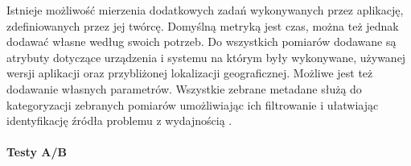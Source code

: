 Istnieje możliwość mierzenia dodatkowych zadań wykonywanych przez aplikację, zdefiniowanych przez jej twórcę. Domyślną metryką jest czas, można też jednak dodawać własne według swoich potrzeb. Do wszystkich pomiarów dodawane są atrybuty dotyczące urządzenia i systemu na którym były wykonywane, używanej wersji aplikacji oraz przybliżonej lokalizacji geograficznej. Możliwe jest też dodawanie własnych parametrów. Wszystkie zebrane metadane służą do kategoryzacji zebranych pomiarów umożliwiając ich  filtrowanie i ułatwiając identyfikację źródła problemu z wydajnością \cite{Fb_Pref_Monitor}.

\paragraph{Testy A/B}
\cite{Fb_AB_Testing}
